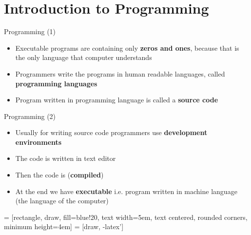 
\section{Introduction to Programming}

\begin{frame}{Programming (1)}
\begin{itemize}
\item Executable programs are containing only \textbf{zeros and ones}, because
that is the only language that computer understands
\item Programmers write the programs in human readable
languages, called \textbf{programming languages}
\item Program written in programming language is called a \textbf{source code}
\end{itemize}
\end{frame}

\begin{frame}{Programming (2)}
\begin{itemize}
  \item Usually for writing source code programmers use \textbf{development
  environments}
  \item The code is written in text editor
  \item Then the code is (\textbf{compiled})
  \item At the end we have \textbf{executable} i.e. program written in machine
  language (the language of the computer)
\end{itemize}
\end{frame}

 = [rectangle, draw, fill=blue!20,
text width=5em, text centered, rounded corners, minimum height=4em]
 = [draw, -latex']

